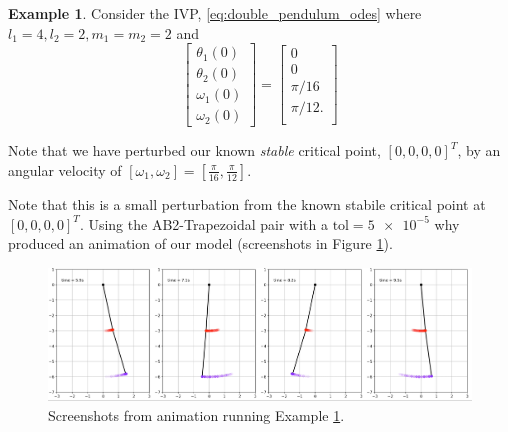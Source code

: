 \documentclass[12pt, twoside]{report}
\theoremstyle{plain}
\theoremstyle{definition}
\theoremstyle{definition}
\newtheorem{example}{Example}[chapter]
\begin{document}
            \begin{example}
            \label{5_double_1}
                Consider the IVP, \eqref{eq:double_pendulum_odes} where 
                $l_1=4, l_2=2, m_1=m_2=2$ and
                \begin{equation}
                    \begin{bmatrix}
                        \theta_1(0)\\
                        \theta_2(0)\\
                        \omega_1(0)\\
                        \omega_2(0)
                    \end{bmatrix}
                    = 
                    \begin{bmatrix}
                        0\\ 0\\ \pi/16\\ \pi/12.\\
                    \end{bmatrix}
                \label{eq:double_ics}
                \end{equation}

                Note that we have perturbed our known \textit{stable} critical 
                point, $[0, 0, 0, 0]^T$, by an angular velocity of 
                $[\omega_1, \omega_2]=[\frac{\pi}{16}, \frac{\pi}{12}]$.
 
                Note that this is a small perturbation from the known stabile critical
                point at $[0, 0, 0, 0]^T$. Using the AB2-Trapezoidal pair with 
                a $\text{tol}=\num{5e-5}$ why produced an animation of our 
                model (screenshots in Figure \ref{5_double_1_an}).
            \end{example}

            \begin{figure}[H]
                \centering
                    \includegraphics[width=\columnwidth]{double_1}
                    \caption{Screenshots from animation running Example 
                    \ref{5_double_1}.}
                    \label{5_double_1_an}
            \end{figure}
\end{document}
